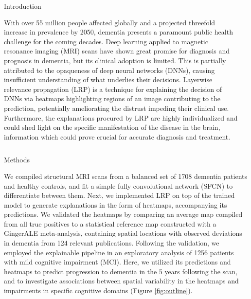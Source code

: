 \documentclass[final, 14pt]{beamer}
\def\verticalspace{0.61cm}
\begin{document}
\begin{frame}[t]
\begin{columns}[t]
    \begin{column}{.33\textwidth}
        \begin{block}{Introduction}
            \parbox{\linewidth}{\justify
With over 55 million people affected globally and a projected threefold increase in prevalence by 2050,
dementia presents a paramount public health challenge for the coming decades.
Deep learning applied to magnetic resonance imaging (MRI) scans have shown great promise for diagnosis and prognosis in dementia, but its clinical adoption is limited. This is partially attributed
to the opaqueness of deep neural networks (DNNs), causing insufficient understanding of what underlies their decisions.
Layerwise relevance propagation (LRP) is a technique for explaining the decision of DNNs via heatmaps highlighting regions of an
image contributing to the prediction, potentially ameliorating the distrust impeding their clinical use. Furthermore,
the explanations procured by LRP are highly individualized and could shed light on the specific manifestation of the disease in the brain,
information which could prove crucial for accurate diagnosis and treatment.
            }
        \end{block}
    \end{column}
    \begin{column}{.63\textwidth}
        
    \end{column}
\end{columns}

\vspace{\verticalspace}

\begin{columns}[t]
  \begin{column}{.33\textwidth}

    \begin{block}{Methods}
        \parbox{\linewidth}{\justify
We compiled structural MRI scans from a balanced set of 1708 dementia patients and healthy controls, and fit
a simple fully convolutional network (SFCN) to differentiate between them. Next, we implemented LRP on top of the trained
model to generate explanations in the form of heatmaps, accompanying its predictions. We validated the heatmaps by comparing an
average map compiled from all true positives to a statistical reference map constructed with a GingerALE meta-analysis,
containing spatial locations with observed deviations in dementia from 124 relevant publications. Following the validation, we employed the explainable pipeline
in an exploratory analysis of 1256 patients with mild cognitive impairment (MCI). Here, we utilized its predictions and heatmaps
to predict progression to dementia in the 5 years following the scan, and to investigate associations between spatial variability in the heatmaps
and impairments in specific cognitive domains (Figure \ref{fig:outline}).
        }
    \end{block}


\end{column}
\end{columns}
\end{frame}
\end{document}
